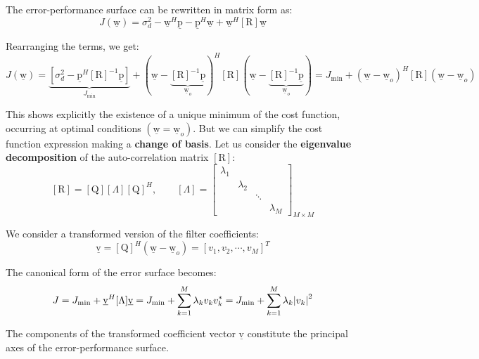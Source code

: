 The error-performance surface can be rewritten in matrix form as:
\[
J(\underline{\mathrm{w}}) = \sigma_d^2 - \underline{\mathrm{w}}^H \underline{\mathrm{p}} - \underline{\mathrm{p}}^H \underline{\mathrm{w}} + \underline{\mathrm{w}}^H [\mathrm{R}] \underline{\mathrm{w}}
\]

Rearranging the terms, we get:
\[
J(\underline{\mathrm{w}}) = \underbrace{\left[ \sigma_d^2 - \underline{\mathrm{p}}^H [\mathrm{R}]^{-1} \underline{\mathrm{p}} \right]}_{J_\text{min}} + \left( \underline{\mathrm{w}} - \underbrace{[\mathrm{R}]^{-1} \underline{\mathrm{p}}}_{\underline{\mathrm{w}}_o} \right)^H [\mathrm{R}] \left( \underline{\mathrm{w}} - \underbrace{[\mathrm{R}]^{-1} \underline{\mathrm{p}}}_{\underline{\mathrm{w}}_o} \right) = J_\text{min} + (\underline{\mathrm{w}} - \underline{\mathrm{w}}_o)^H [\mathrm{R}] (\underline{\mathrm{w}} - \underline{\mathrm{w}}_o)
\]

This shows explicitly the existence of a unique minimum of the cost function, occurring at optimal conditions \( (\underline{\mathrm{w}} = \underline{\mathrm{w}}_o) \).
But we can simplify the cost function expression making a \textbf{change of basis}.
Let us consider the \textbf{eigenvalue decomposition} of the auto-correlation matrix \([\mathrm{R}]\):
\[
[\mathrm{R}] = [\mathrm{Q}] [\Lambda] [\mathrm{Q}]^H, \qquad [\Lambda] =
\begin{bmatrix}
\lambda_1 \\ 
 & \lambda_2 \\
 & & \ddots \\
 & & & \lambda_M
\end{bmatrix}_{M \times M}
\]

We consider a transformed version of the filter coefficients:
\[
\underline{\mathrm{v}} = [\mathrm{Q}]^H \left(\underline{\mathrm{w}} - \underline{\mathrm{w}}_o\right) = \left[ v_1, v_2, \cdots, v_M \right]^T
\]

The canonical form of the error surface becomes:
\[
J = J_\text{min} + \underline{\mathrm{v}}^H [\Lambda]  \underline{\mathrm{v}}= J_\text{min} + \sum_{k=1}^M \lambda_k v_k v_k^* = J_\text{min} + \sum_{k=1}^M \lambda_k \abs{v_k}^2
\]

The components of the transformed coefficient vector \( \underline{\mathrm{v}} \) constitute the principal axes of the error-performance surface.

\clearpage
